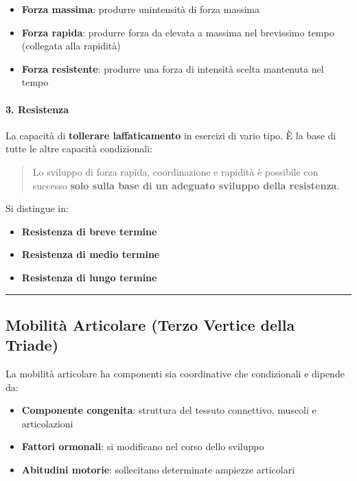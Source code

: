 \documentclass[a4paper,11pt]{article}
\providecommand{\tightlist}{%
  \setlength{\itemsep}{0pt}\setlength{\parskip}{0pt}}
\begin{document}
\begin{itemize}
      \tightlist
      \item
            \textbf{Forza massima}: produrre un\textquotesingle intensità di forza
            massima
      \item
            \textbf{Forza rapida}: produrre forza da elevata a massima nel
            brevissimo tempo (collegata alla rapidità)
      \item
            \textbf{Forza resistente}: produrre una forza di intensità scelta
            mantenuta nel tempo
\end{itemize}

\paragraph{3. Resistenza}\label{resistenza}

La capacità di \textbf{tollerare l\textquotesingle affaticamento} in
esercizi di vario tipo. È la base di tutte le altre capacità
condizionali:

\begin{quote}
      Lo sviluppo di forza rapida, coordinazione e rapidità è possibile con
      successo \textbf{solo sulla base di un adeguato sviluppo della
            resistenza}.
\end{quote}

Si distingue in:

\begin{itemize}
      \tightlist
      \item
            \textbf{Resistenza di breve termine}
      \item
            \textbf{Resistenza di medio termine}
      \item
            \textbf{Resistenza di lungo termine}
\end{itemize}

\begin{center}\rule{0.5\linewidth}{0.5pt}\end{center}

\subsection{Mobilità Articolare (Terzo Vertice della
      Triade)}\label{mobilituxe0-articolare-terzo-vertice-della-triade}

La mobilità articolare ha componenti sia coordinative che condizionali e
dipende da:

\begin{itemize}
      \tightlist
      \item
            \textbf{Componente congenita}: struttura del tessuto connettivo,
            muscoli e articolazioni
      \item
            \textbf{Fattori ormonali}: si modificano nel corso dello sviluppo
      \item
            \textbf{Abitudini motorie}: sollecitano determinate ampiezze
            articolari
\end{itemize}
\end{document}
